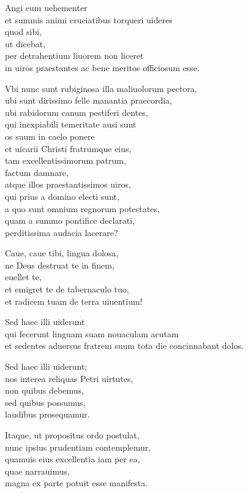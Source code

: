 \documentclass[a5paper,twoside]{article}
\begin{document}
Angi eum uehementer \\
et summis animi cruciatibus torqueri uideres \\
quod sibi, \\
ut dicebat, \\
per detrahentium liuorem non liceret \\
in uiros praestantes ac bene meritos officiosum esse.

Vbi nunc sunt rubiginosa illa maliuolorum pectora, \\
ubi sunt dirissimo felle manantia praecordia, \\
ubi rabidorum canum pestiferi dentes, \\
qui inexpiabili temeritate ausi sunt \\
os suum in caelo ponere \\
et uicarii Christi fratrumque eius, \\
tam excellentissimorum patrum, \\
factum damnare, \\
atque illos praestantissimos uiros, \\
qui prius a domino electi sunt, \\
a quo sunt omnium regnorum potestates, \\
quam a summo pontifice declarati, \\
perditissima audacia lacerare?  

Caue, caue tibi, lingua dolosa, \\
ne Deus destruat te in finem, \\
euellet te, \\
et emigret te de tabernaculo tuo, \\
et radicem tuam de terra uiuentium!  

Sed haec illi uiderunt \\
qui fecerunt linguam suam nouaculam acutam \\
et sedentes aduersus fratrem suum tota die concinnabant dolos. 

Sed haec illi uiderunt; \\
nos interea reliquas Petri uirtutes, \\
non quibus debemus, \\
sed quibus possumus, \\
laudibus prosequamur.

Itaque, ut propositus ordo postulat, \\
nunc ipsius prudentiam contemplemur, \\
quamuis eius excellentia iam per ea, \\
quae narrauimus, \\
magna ex parte potuit esse manifesta. 
\end{document}
